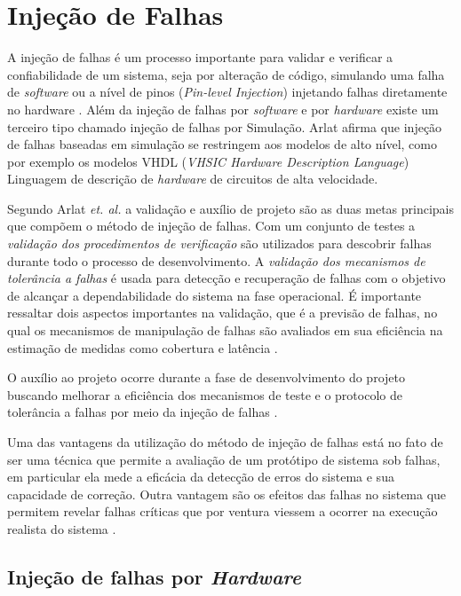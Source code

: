 \section{Injeção de Falhas} \label{sec:InjecaoDeFalhas}

A injeção de falhas é um processo importante para validar e verificar a confiabilidade de um sistema, seja por alteração de código, simulando uma falha de \textit{software} \cite{Kanawati:1995} ou a nível de pinos (\textit{Pin-level Injection}) injetando falhas diretamente no hardware \cite{Arlat:2003}. Além da injeção de  falhas por \textit{software} e por \textit{hardware} existe um terceiro tipo chamado injeção de falhas por Simulação. Arlat \cite{Arlat:2003} afirma que injeção de falhas baseadas em simulação se restringem aos modelos de alto nível, como por exemplo os modelos VHDL (\textit{VHSIC Hardware Description Language}) Linguagem de descrição de \textit{hardware} de circuitos de alta velocidade. 

Segundo Arlat \textit{et. al.} \cite{Arlat:1990} a validação e auxílio de projeto são as duas metas principais que compõem o método de injeção de falhas. Com um conjunto de testes a \textit{validação dos procedimentos de verificação} são utilizados para descobrir falhas durante todo o processo de desenvolvimento. A \textit{validação dos mecanismos de tolerância a falhas} é usada para detecção e recuperação de falhas com o objetivo de alcançar a dependabilidade do sistema na fase operacional. É importante ressaltar dois aspectos importantes na validação, que é a previsão de falhas, no qual os mecanismos de manipulação de falhas são avaliados em sua eficiência na estimação de medidas como cobertura e latência \cite{Arlat:1990}.

O auxílio ao projeto ocorre durante a fase de desenvolvimento do projeto buscando melhorar a eficiência dos mecanismos de teste  e o protocolo de tolerância a falhas por meio da injeção de falhas \cite{Arlat:1990}.

Uma das vantagens da utilização do método de injeção de falhas está no fato de ser uma técnica que permite a avaliação de um protótipo de sistema sob falhas, em particular ela mede a eficácia da detecção de erros do sistema e sua capacidade de correção. Outra vantagem são os efeitos das falhas no sistema que permitem revelar falhas críticas que por ventura viessem a ocorrer na execução realista do sistema \cite{Arlat:2003}.     

\subsection{Injeção de falhas por \textit{Hardware}}

